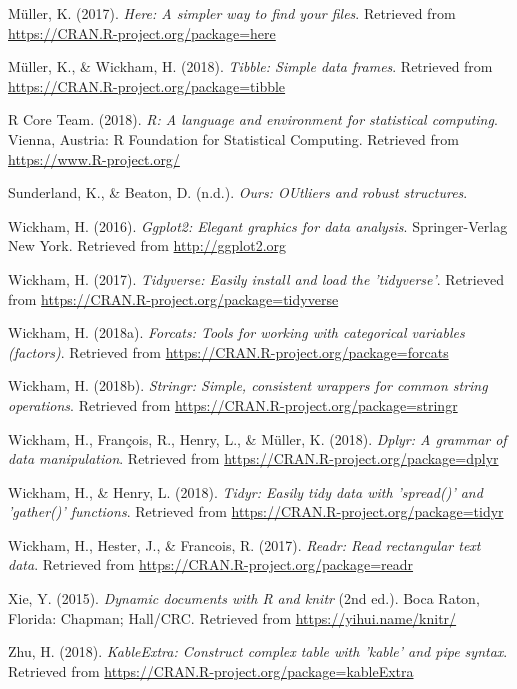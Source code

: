 \documentclass[man,floatsintext]{apa6}
\theoremstyle{definition}
\theoremstyle{definition}
\theoremstyle{definition}
\theoremstyle{remark}
\begin{document}
\leavevmode\hypertarget{ref-R-here}{}%
Müller, K. (2017). \emph{Here: A simpler way to find your files}.
Retrieved from \url{https://CRAN.R-project.org/package=here}

\leavevmode\hypertarget{ref-R-tibble}{}%
Müller, K., \& Wickham, H. (2018). \emph{Tibble: Simple data frames}.
Retrieved from \url{https://CRAN.R-project.org/package=tibble}

\leavevmode\hypertarget{ref-R-base}{}%
R Core Team. (2018). \emph{R: A language and environment for statistical
computing}. Vienna, Austria: R Foundation for Statistical Computing.
Retrieved from \url{https://www.R-project.org/}

\leavevmode\hypertarget{ref-R-ours}{}%
Sunderland, K., \& Beaton, D. (n.d.). \emph{Ours: OUtliers and robust
structures}.

\leavevmode\hypertarget{ref-R-ggplot2}{}%
Wickham, H. (2016). \emph{Ggplot2: Elegant graphics for data analysis}.
Springer-Verlag New York. Retrieved from \url{http://ggplot2.org}

\leavevmode\hypertarget{ref-R-tidyverse}{}%
Wickham, H. (2017). \emph{Tidyverse: Easily install and load the
'tidyverse'}. Retrieved from
\url{https://CRAN.R-project.org/package=tidyverse}

\leavevmode\hypertarget{ref-R-forcats}{}%
Wickham, H. (2018a). \emph{Forcats: Tools for working with categorical
variables (factors)}. Retrieved from
\url{https://CRAN.R-project.org/package=forcats}

\leavevmode\hypertarget{ref-R-stringr}{}%
Wickham, H. (2018b). \emph{Stringr: Simple, consistent wrappers for
common string operations}. Retrieved from
\url{https://CRAN.R-project.org/package=stringr}

\leavevmode\hypertarget{ref-R-dplyr}{}%
Wickham, H., François, R., Henry, L., \& Müller, K. (2018). \emph{Dplyr:
A grammar of data manipulation}. Retrieved from
\url{https://CRAN.R-project.org/package=dplyr}

\leavevmode\hypertarget{ref-R-tidyr}{}%
Wickham, H., \& Henry, L. (2018). \emph{Tidyr: Easily tidy data with
'spread()' and 'gather()' functions}. Retrieved from
\url{https://CRAN.R-project.org/package=tidyr}

\leavevmode\hypertarget{ref-R-readr}{}%
Wickham, H., Hester, J., \& Francois, R. (2017). \emph{Readr: Read
rectangular text data}. Retrieved from
\url{https://CRAN.R-project.org/package=readr}

\leavevmode\hypertarget{ref-R-knitr}{}%
Xie, Y. (2015). \emph{Dynamic documents with R and knitr} (2nd ed.).
Boca Raton, Florida: Chapman; Hall/CRC. Retrieved from
\url{https://yihui.name/knitr/}

\leavevmode\hypertarget{ref-R-kableExtra}{}%
Zhu, H. (2018). \emph{KableExtra: Construct complex table with 'kable'
and pipe syntax}. Retrieved from
\url{https://CRAN.R-project.org/package=kableExtra}

\endgroup
\end{document}
